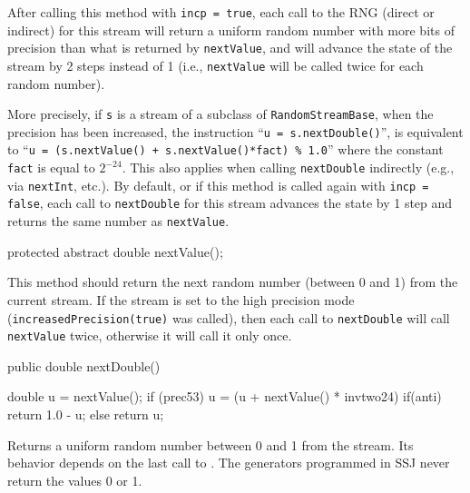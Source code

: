  \begin{tabb} After calling this method with \texttt{incp = true}, each call to 
  the RNG (direct or indirect) for this stream 
  will return a uniform random number with more bits of precision than what
  is returned by \texttt{nextValue},
  and will advance the state of the stream by 2 steps instead of 1
  (i.e., \texttt{nextValue} will be called twice for each random number).

  More precisely, if \texttt{s} is a stream of a subclass of 
  \texttt{RandomStreamBase}, when the precision has been increased,
  the instruction ``\texttt{u = s.nextDouble()}'',  is equivalent to
  ``\texttt{u = (s.nextValue() + s.nextValue()*fact) \%\ 1.0}'' 
  where the constant \texttt{fact} is equal to $2^{-24}$.
  This also applies when calling \texttt{nextDouble} indirectly
  (e.g., via \texttt{nextInt}, etc.).
  By default, or if this method is called again with \texttt{incp = false}, 
  each call to \texttt{nextDouble} for this stream advances the state by 1 step
  and returns the same number as \texttt{nextValue}.  
\end{tabb}
\begin{htmlonly}
\end{htmlonly}
\begin{code}

   protected abstract double nextValue();
\end{code}
\begin{tabb}
  This method should return the next random number (between 0 and 1) 
  from the current stream.
  If the stream is set to the high precision mode 
  (\texttt{increasedPrecision(true)} was called), then each call to 
  \texttt{nextDouble} will call \texttt{nextValue} twice, otherwise it will
  call it only once. 
\end{tabb}
\begin{htmlonly}
\end{htmlonly}
\begin{code}

   public double nextDouble() \begin{hide} {
      double u = nextValue();
      if (prec53)
         u = (u + nextValue() * invtwo24) %
      if(anti)
         return 1.0 - u;
      else
         return u;
   }\end{hide}
\end{code}
\begin{tabb} Returns a uniform random number between 0 and 1 from the stream. 
  Its behavior depends on the last call to .
  The generators programmed in SSJ never return the values 0 or 1.
\end{tabb}
